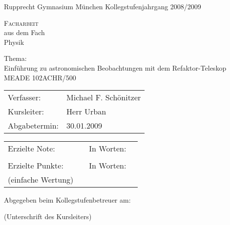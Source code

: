 \noindent Rupprecht Gymnasium München \hfill Kollegstufenjahrgang
2008/2009
\vfill
\begin{center}
  {\huge \textsc{Facharbeit}}\\
  aus dem Fach\\
  {\Large Physik}
\end{center}
\vfill
\begin{center}
  Thema:\\
  Einführung zu astronomischen Beobachtungen mit dem Refaktor-Teleskop
MEADE 102ACHR/500
\end{center}
\vfill
\noindent
\begin{tabular}{ll}
  Verfasser:    & Michael F. Schönitzer \\
  Kursleiter:   & Herr Urban \\
  Abgabetermin: & 30.01.2009
\end{tabular}
\vfill
\noindent\begin{tabular}{lp{2cm}lp{5cm}}
Erzielte Note: & \dotfill & In Worten: & \dotfill \\
&&&\\
Erzielte Punkte: & \dotfill & In Worten: & \dotfill \\
{\small(einfache Wertung)} &&&
\end{tabular}
\vfill
\noindent Abgegeben beim Kollegstufenbetreuer am: \parbox{4cm}{\dotfill}
\vfill
\begin{minipage}[t]{6cm} %
\dotfill
\begin{center}
\small (Unterschrift des Kursleiters)
\end{center}
\end{minipage}
